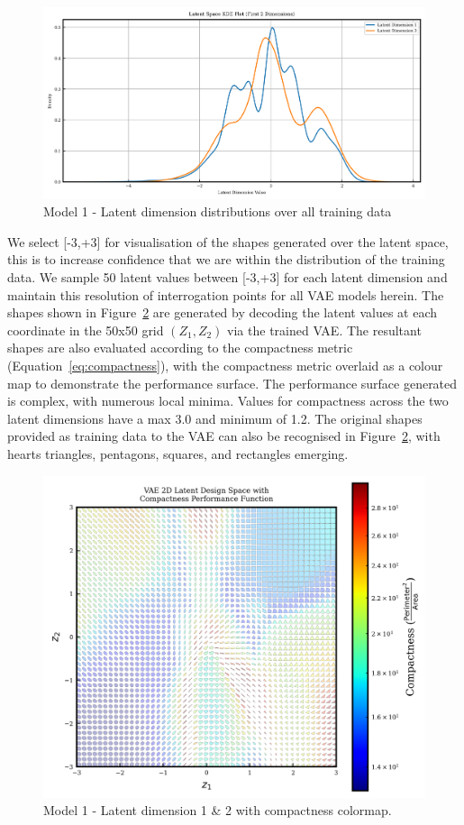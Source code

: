 \documentclass{article}
\begin{document}
\begin{figure}[H]
    \centering
    \includegraphics[width=0.75\linewidth]{figures/VAEmodels/model1/latent_distribution.png}
    \caption{Model 1 - Latent dimension distributions over all training data}
    \label{fig:model1_latent_dist}
\end{figure}


We select [-3,+3] for visualisation of the shapes generated over the latent space, this is to increase confidence that we are within the distribution of the training data. We sample 50 latent values between [-3,+3] for each latent dimension and maintain this resolution of interrogation points for all VAE models herein. The shapes shown in Figure~\ref{fig:model1_latent_visualisation} are generated by decoding the latent values at each coordinate in the 50x50 grid $(Z_1,Z_2)$ via the trained VAE. The resultant shapes are also evaluated according to the compactness metric (Equation~\eqref{eq:compactness}), with the compactness metric overlaid as a colour map to demonstrate the performance surface. The performance surface generated is complex, with numerous local minima. Values for compactness across the two latent dimensions have a max 3.0 and minimum of 1.2. The original shapes provided as training data to the VAE can also be recognised in Figure~\ref{fig:model1_latent_visualisation}, with hearts triangles, pentagons, squares, and rectangles emerging.

\begin{figure}[H]
    \centering
    \includegraphics[width=0.75\linewidth]{figures/VAEmodels/model1/latent_vis_1000epochs.png}
    \caption{Model 1 - Latent dimension 1 \& 2 with compactness colormap.}
    \label{fig:model1_latent_visualisation}
\end{figure}
\end{document}

